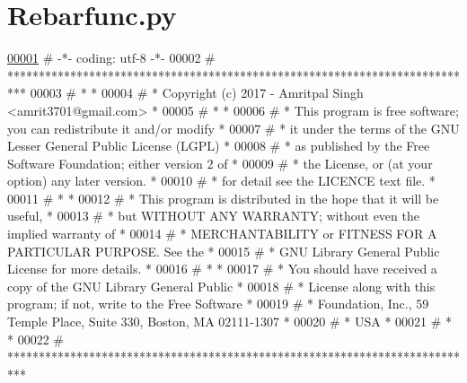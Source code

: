 \hypertarget{Rebarfunc_8py_source}{}\section{Rebarfunc.\+py}

\begin{DoxyCode}
\hypertarget{Rebarfunc_8py_source.tex_l00001}{}\hyperlink{namespaceRebarfunc}{00001} \textcolor{comment}{# -*- coding: utf-8 -*-}
00002 \textcolor{comment}{# ***************************************************************************}
00003 \textcolor{comment}{# *                                                                         *}
00004 \textcolor{comment}{# *   Copyright (c) 2017 - Amritpal Singh <amrit3701@gmail.com>             *}
00005 \textcolor{comment}{# *                                                                         *}
00006 \textcolor{comment}{# *   This program is free software; you can redistribute it and/or modify  *}
00007 \textcolor{comment}{# *   it under the terms of the GNU Lesser General Public License (LGPL)    *}
00008 \textcolor{comment}{# *   as published by the Free Software Foundation; either version 2 of     *}
00009 \textcolor{comment}{# *   the License, or (at your option) any later version.                   *}
00010 \textcolor{comment}{# *   for detail see the LICENCE text file.                                 *}
00011 \textcolor{comment}{# *                                                                         *}
00012 \textcolor{comment}{# *   This program is distributed in the hope that it will be useful,       *}
00013 \textcolor{comment}{# *   but WITHOUT ANY WARRANTY; without even the implied warranty of        *}
00014 \textcolor{comment}{# *   MERCHANTABILITY or FITNESS FOR A PARTICULAR PURPOSE.  See the         *}
00015 \textcolor{comment}{# *   GNU Library General Public License for more details.                  *}
00016 \textcolor{comment}{# *                                                                         *}
00017 \textcolor{comment}{# *   You should have received a copy of the GNU Library General Public     *}
00018 \textcolor{comment}{# *   License along with this program; if not, write to the Free Software   *}
00019 \textcolor{comment}{# *   Foundation, Inc., 59 Temple Place, Suite 330, Boston, MA  02111-1307  *}
00020 \textcolor{comment}{# *   USA                                                                   *}
00021 \textcolor{comment}{# *                                                                         *}
00022 \textcolor{comment}{# ***************************************************************************}

\end{DoxyCode}
